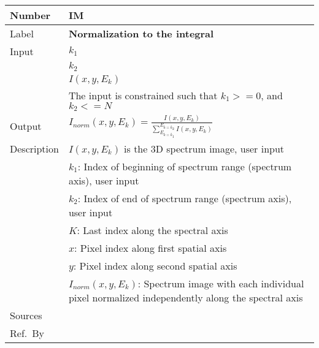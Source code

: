 \documentclass[12pt]{article}
\newcommand{\colAwidth}{0.13\textwidth}
\newcommand{\colBwidth}{0.82\textwidth}
\newcounter{instnum} %
\begin{document}
~\newline


\noindent
\begin{minipage}{\textwidth}
	\renewcommand*{\arraystretch}{1.5}
	\begin{tabular}{| p{\colAwidth} | p{\colBwidth}|}
		  \hline
		  \rowcolor[gray]{0.9}
		  Number& IM{instnum}\theinstnum \label{normalization}\\
		  \hline
		  Label& \bf Normalization to the integral\\
		  \hline
		  Input& $k_1$\\
		  & $k_2$\\
		  & $I(x,y,E_k)$\\
		  & The input is constrained such that $k_1 >= 0$, and $k_2 <= N$\\
		  \hline
		  Output& $I_{norm}(x,y,E_k)=\frac{I(x,y,E_k)}{\sum_{E_{k=k_1}}^{E_{k=k_2}} I(x,y,E_k)}$\\
		  \hline
		  Description&$I(x,y,E_k)$ is the 3D spectrum image, user input\\
		  &$k_1$: Index of beginning of spectrum range (spectrum axis), user input\\
		  &$k_2$: Index of end of spectrum range (spectrum axis), user input\\
		  &$K$: Last index along the spectral axis\\
		  &$x$: Pixel index along first spatial axis\\
		  &$y$: Pixel index along second spatial axis\\
		  &$I_{norm}(x,y,E_k)$: Spectrum image with each individual pixel normalized independently along the spectral axis\\
		  \hline
		  Sources&\\
		  \hline
		  Ref.\ By &\\
		  \hline
	\end{tabular}
\end{minipage}\\

~\newline

\end{document}
